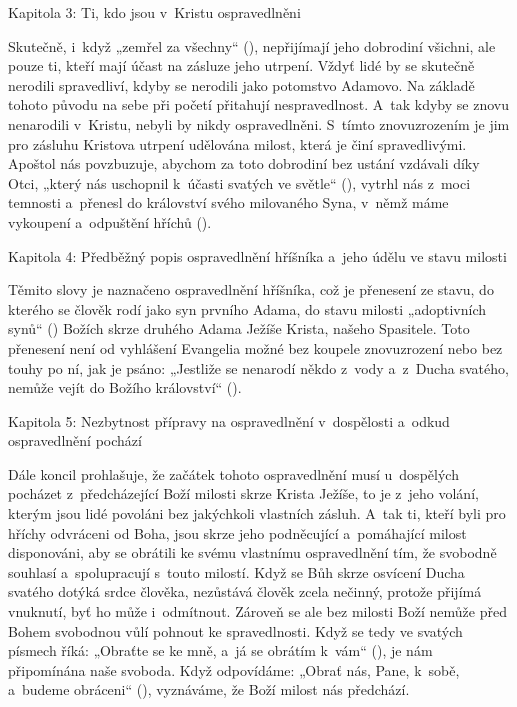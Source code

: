 \chaptitle
Kapitola 3:
Ti, kdo jsou v~Kristu ospravedlněni

Skutečně, i~když „zemřel za všechny“ (), nepřijímají jeho dobrodiní všichni,
ale pouze ti, kteří mají účast na zásluze jeho utrpení. Vždyť lidé by se skutečně
nerodili spravedliví, kdyby se nerodili jako potomstvo Adamovo. Na základě tohoto
původu na sebe při početí přitahují nespravedlnost. A~tak kdyby se znovu nenarodili
v~Kristu, nebyli by nikdy ospravedlněni. S~tímto znovuzrozením je jim pro zásluhu
Kristova utrpení udělována milost, která je činí spravedlivými. Apoštol nás povzbuzuje,
abychom za toto dobrodiní bez ustání vzdávali díky Otci, „který nás uschopnil k~účasti
svatých ve světle“ (), vytrhl nás z~moci temnosti a~přenesl do království
svého milovaného Syna, v~němž máme vykoupení a~odpuštění hříchů ().

\chaptitle
Kapitola 4:
Předběžný popis ospravedlnění hříšníka a~jeho údělu ve stavu milosti

Těmito slovy je naznačeno ospravedlnění hříšníka, což je přenesení ze stavu, do kterého
se člověk rodí jako syn prvního Adama, do stavu milosti „adoptivních synů“ ()
Božích skrze druhého Adama Ježíše Krista, našeho Spasitele. Toto přenesení není
od vyhlášení Evangelia možné bez koupele znovuzrození nebo bez touhy po ní, jak je
psáno: „Jestliže se nenarodí někdo z~vody a~z~Ducha svatého, nemůže vejít do Božího
království“ ().

\chaptitle
Kapitola 5:
Nezbytnost přípravy na ospravedlnění v~dospělosti a~odkud ospravedlnění pochází

Dále koncil prohlašuje, že začátek tohoto ospravedlnění musí u~dospělých pocházet
z~předcházející Boží milosti skrze Krista Ježíše, to je z~jeho volání, kterým jsou
lidé povoláni bez jakýchkoli vlastních zásluh. A~tak ti, kteří byli pro hříchy odvráceni
od Boha, jsou skrze jeho podněcující a~pomáhající milost disponováni, aby se obrátili
ke svému vlastnímu ospravedlnění tím, že svobodně souhlasí a~spolupracují s~touto
milostí. Když se Bůh skrze osvícení Ducha svatého dotýká srdce člověka, nezůstává
člověk zcela nečinný, protože přijímá vnuknutí, byť ho může i~odmítnout. Zároveň
se ale bez milosti Boží nemůže před Bohem svobodnou vůlí pohnout ke spravedlnosti.
Když se tedy ve svatých písmech říká: „Obraťte se ke mně, a~já se obrátím k~vám“
(), je nám připomínána naše svoboda. Když odpovídáme: „Obrať nás, Pane,
k~sobě, a~budeme obráceni“ (), vyznáváme, že Boží milost nás předchází.

